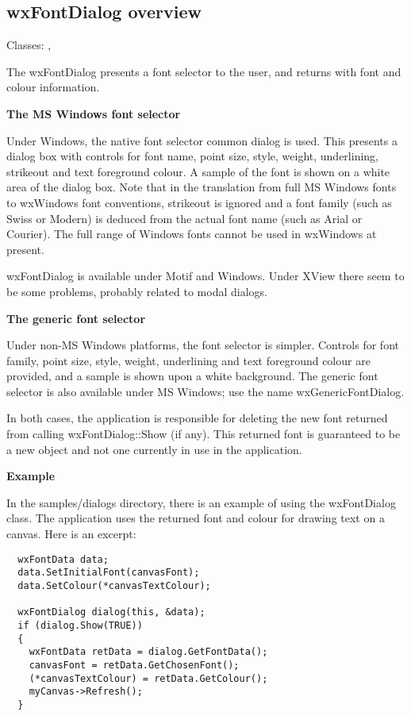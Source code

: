 \subsection{wxFontDialog overview}\label{wxfontdialogoverview}

Classes: , 

The wxFontDialog presents a font selector to the user, and returns
with font and colour information.

{\bf The MS Windows font selector}

Under Windows, the native font selector common dialog is used. This
presents a dialog box with controls for font name, point size, style, weight,
underlining, strikeout and text foreground colour. A sample of the
font is shown on a white area of the dialog box. Note that
in the translation from full MS Windows fonts to wxWindows font
conventions, strikeout is ignored and a font family (such as
Swiss or Modern) is deduced from the actual font name (such as Arial
or Courier). The full range of Windows fonts cannot be used in wxWindows
at present.

wxFontDialog is available under Motif and Windows. Under XView there
seem to be some problems, probably related to modal dialogs.

{\bf The generic font selector}

Under non-MS Windows platforms, the font selector is simpler.
Controls for font family, point size, style, weight,
underlining and text foreground colour are provided, and
a sample is shown upon a white background. The generic font selector
is also available under MS Windows; use the name wxGenericFontDialog.

In both cases, the application is responsible for deleting the
new font returned from calling wxFontDialog::Show (if any).
This returned font is guaranteed to be a new object and not
one currently in use in the application.

{\bf Example}

In the samples/dialogs directory, there is an example of using
the wxFontDialog class. The application uses the returned font
and colour for drawing text on a canvas. Here is an excerpt:

\begin{verbatim}
  wxFontData data;
  data.SetInitialFont(canvasFont);
  data.SetColour(*canvasTextColour);
      
  wxFontDialog dialog(this, &data);
  if (dialog.Show(TRUE))
  {
    wxFontData retData = dialog.GetFontData();
    canvasFont = retData.GetChosenFont();
    (*canvasTextColour) = retData.GetColour();
    myCanvas->Refresh();
  }
\end{verbatim}

